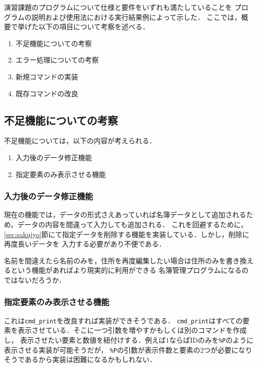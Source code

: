 \documentclass[a4j,11pt]{jarticle}
\begin{document}
演習課題のプログラムについて仕様と要件をいずれも満たしていることを
プログラムの説明および使用法における実行結果例によって示した．
ここでは，概要で挙げた以下の項目について考察を述べる．

\begin{enumerate}
\setlength{\parskip}{2pt} \setlength{\itemsep}{2pt}
    \item 不足機能についての考察
    \item エラー処理についての考察
    \item 新規コマンドの実装
    \item 既存コマンドの改良
\end{enumerate}

\subsection{不足機能についての考察}\label{sec:husoku}
不足機能については，以下の内容が考えられる．
\begin{enumerate}
\setlength{\parskip}{2pt} \setlength{\itemsep}{2pt}
   \item 入力後のデータ修正機能
   \item 指定要素のみ表示させる機能
\end{enumerate}
\subsubsection{入力後のデータ修正機能}
現在の機能では，データの形式さえあっていれば名簿データとして追加されるため，データの内容を間違って入力しても追加される．
これを回避するために，\ref{sec:sakujyo}節にて指定データを削除する機能を実装している．しかし，削除に再度長いデータを
入力する必要があり不便である．

名前を間違えたら名前のみを，住所を再度編集したい場合は住所のみを書き換えるという機能があればより現実的に利用ができる
名簿管理プログラムになるのではないだろうか．
\subsubsection{指定要素のみ表示させる機能}
これは\verb|cmd_print|を改良すれば実装ができそうである．
\verb|cmd_print|はすべての要素を表示させている．そこに一つ引数を増やすかもしくは別のコマンドを作成し，
表示させたい要素と数値を紐付けする．例えば$1$ならばIDのみを\verb|%P|のように表示させる実装が可能そうだが，
\verb|%P|の引数が表示件数と要素の2つが必要になりそうであるから実装は困難になるかもしれない．
\end{document}
